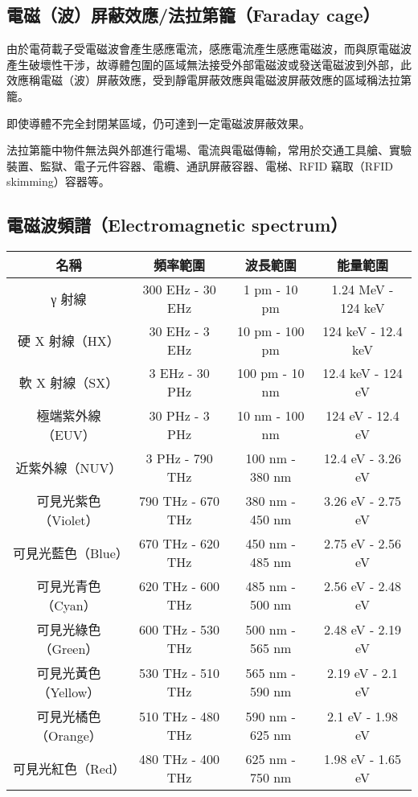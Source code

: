 \documentclass[a4paper,12pt]{report}
\begin{document}
\begin{itemize}
\subsection{電磁（波）屏蔽效應/法拉第籠（Faraday cage）}
由於電荷載子受電磁波會產生感應電流，感應電流產生感應電磁波，而與原電磁波產生破壞性干涉，故導體包圍的區域無法接受外部電磁波或發送電磁波到外部，此效應稱電磁（波）屏蔽效應，受到靜電屏蔽效應與電磁波屏蔽效應的區域稱法拉第籠。

即使導體不完全封閉某區域，仍可達到一定電磁波屏蔽效果。

法拉第籠中物件無法與外部進行電場、電流與電磁傳輸，常用於交通工具艙、實驗裝置、監獄、電子元件容器、電纜、通訊屏蔽容器、電梯、RFID 竊取（RFID skimming）容器等。
\subsection{電磁波頻譜（Electromagnetic spectrum）}
\bct
\begin{table}[H]
\centering
\begin{tabular}{|c|c|c|c|}
\hline
\textbf{名稱} & \textbf{頻率範圍} & \textbf{波長範圍} & \textbf{能量範圍} \\
\hline
γ 射線 & 300 EHz - 30 EHz & 1 pm - 10 pm & 1.24 MeV - 124 keV \\
\hline
硬 X 射線（HX） & 30 EHz - 3 EHz & 10 pm - 100 pm & 124 keV - 12.4 keV \\
\hline
軟 X 射線（SX） & 3 EHz - 30 PHz & 100 pm - 10 nm & 12.4 keV - 124 eV \\
\hline
極端紫外線（EUV） & 30 PHz - 3 PHz & 10 nm - 100 nm & 124 eV - 12.4 eV \\
\hline
近紫外線（NUV） & 3 PHz - 790 THz & 100 nm - 380 nm & 12.4 eV - 3.26 eV \\
\hline
可見光紫色（Violet） & 790 THz - 670 THz & 380 nm - 450 nm & 3.26 eV - 2.75 eV \\
\hline
可見光藍色（Blue） & 670 THz - 620 THz & 450 nm - 485 nm & 2.75 eV - 2.56 eV \\
\hline
可見光青色（Cyan） & 620 THz - 600 THz & 485 nm - 500 nm & 2.56 eV - 2.48 eV \\
\hline
可見光綠色（Green） & 600 THz - 530 THz & 500 nm - 565 nm & 2.48 eV - 2.19 eV \\
\hline
可見光黃色（Yellow） & 530 THz - 510 THz & 565 nm - 590 nm & 2.19 eV - 2.1 eV \\
\hline
可見光橘色（Orange） & 510 THz - 480 THz & 590 nm - 625 nm & 2.1 eV - 1.98 eV \\
\hline
可見光紅色（Red） & 480 THz - 400 THz & 625 nm - 750 nm & 1.98 eV - 1.65 eV \\

\end{tabular}
\end{table}
\end{itemize}
\end{document}
